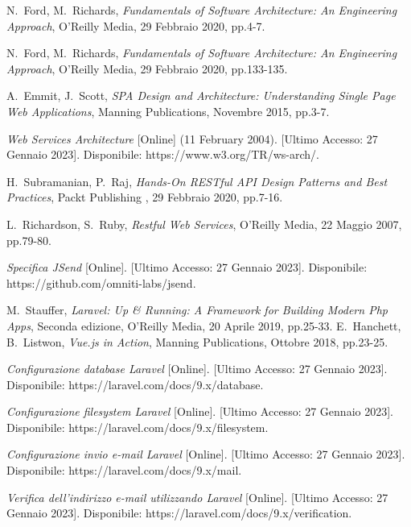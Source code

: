 \begin{thebibliography}{999}
	
N.~Ford, M.~Richards,
{\em Fundamentals of Software Architecture: An Engineering Approach},
O'Reilly Media, 29 Febbraio 2020, pp.4-7.

N.~Ford, M.~Richards,
{\em Fundamentals of Software Architecture: An Engineering Approach},
O'Reilly Media, 29 Febbraio 2020, pp.133-135.

A.~Emmit, J.~Scott,
{\em SPA Design and Architecture: Understanding Single Page Web Applications},
Manning Publications, Novembre 2015, pp.3-7.

{\em Web Services Architecture} [Online] (11 February 2004). [Ultimo Accesso: 27 Gennaio 2023].
Disponibile: https://www.w3.org/TR/ws-arch/.

H.~Subramanian, P.~Raj,
{\em Hands-On RESTful API Design Patterns and Best Practices}, 
Packt Publishing , 29 Febbraio 2020, pp.7-16.

L.~Richardson, S.~Ruby,
{\em Restful Web Services}, 
O'Reilly Media, 22 Maggio 2007, pp.79-80.

{\em Specifica JSend} [Online]. [Ultimo Accesso: 27 Gennaio 2023].
Disponibile: https://github.com/omniti-labs/jsend.

M.~Stauffer,
{\em Laravel: Up \& Running: A Framework for Building Modern Php Apps}, Seconda edizione,
O'Reilly Media, 20 Aprile 2019, pp.25-33.
E.~Hanchett, B.~Listwon,
{\em Vue.js in Action},
Manning Publications, Ottobre 2018, pp.23-25.

{\em Configurazione database Laravel} [Online]. [Ultimo Accesso: 27 Gennaio 2023].
Disponibile: https://laravel.com/docs/9.x/database.

{\em Configurazione filesystem Laravel} [Online]. [Ultimo Accesso: 27 Gennaio 2023].
Disponibile: https://laravel.com/docs/9.x/filesystem.

{\em Configurazione invio e-mail Laravel} [Online]. [Ultimo Accesso: 27 Gennaio 2023].
Disponibile: https://laravel.com/docs/9.x/mail.

{\em Verifica dell'indirizzo e-mail utilizzando Laravel} [Online]. [Ultimo Accesso: 27 Gennaio 2023].
Disponibile: https://laravel.com/docs/9.x/verification.


\end{thebibliography}
